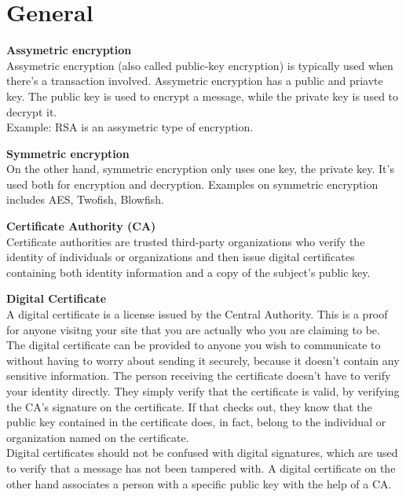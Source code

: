 \setlength{\parskip}{1.5em}   %
\setlength\parindent{0pt}   %
\section{General}

\textbf{Assymetric encryption} \\
Assymetric encryption (also called public-key encryption) is typically used when there's a transaction involved. Assymetric encryption has a public and priavte key. The public key is used to encrypt a message, while the private key is used to decrypt it. \\ 
Example: RSA is an assymetric type of encryption. 

\textbf{Symmetric encryption} \\
On the other hand, symmetric encryption only uses one key, the private key. It's used both for encryption and decryption. Examples on symmetric encryption includes AES, Twofish, Blowfish. 

\textbf{Certificate Authority (CA)} \\
Certificate authorities are trusted third-party organizations who verify the identity of individuals or organizations and then issue digital certificates containing both identity information and a copy of the subject's public key. 

\textbf{Digital Certificate} \\
A digital certificate is a license issued by the Central Authority. This is a proof for anyone visitng your site that you are actually who you are claiming to be. The digital certificate can be provided to anyone you wish to communicate to without having to worry about sending it securely, because it doesn't contain any sensitive information. The person receiving the certificate doesn't have to verify your identity directly. They simply verify that the certificate is valid, by verifying the CA's signature on the certificate. If that checks out, they know that the public key contained in the certificate does, in fact, belong to the individual or organization named on the certificate. \\
Digital certificates should not be confused with digital signatures, which are used to verify that a message has not been tampered with. A digital certificate on the other hand associates a person with a specific public key with the help of a CA.

